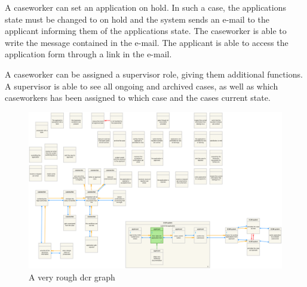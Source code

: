 A caseworker can set an application on hold. In such a case, the applications state must be changed to on hold and the system sends an e-mail to the applicant informing them of the applications state. The caseworker is able to write the message contained in the e-mail. The applicant is able to access the application form through a link in the e-mail.

\vspace{2mm}

A caseworker can be assigned a supervisor role, giving them additional functions. A supervisor is able to see all ongoing and archived cases, as well as which caseworkers has been assigned to which case and the cases current state.
\newpage
\begin{figure}[htb!]
	\includegraphics[width=\textwidth]{img/dcr}
	\caption{A very rough dcr graph}
\end{figure}